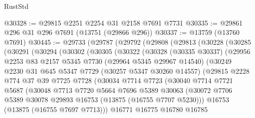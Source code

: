 \begin{lexlean}{RustStd}
\begin{coremodule}
@30328 := @29815 @2251 @2254 @31 @2158 @7691 @7731
@30335 := @29861 @296 @31 @296 @7691 (@13751 (@29866 @296))
@30337 := @13759 (@13760 @7691)
@30445 := @29733
    (@29787
      (@29792
        (@29808
          (@29813
            (@30228
              (@30285
                (@30291
                  (@30294
                    (@30302
                      (@30305
                        (@30322
                          (@30328
                            (@30335 @30337)
                            (@29956
                              @2253
                              @83
                              @2157
                              @5345
                              @7730
                              (@29964 @5345 @29967 @14540)
                              (@30249
                                @2230
                                @31
                                @645
                                @5347
                                @7729
                                (@30257 @5347 @30260 @14557)
                                (@29815
                                  @2228
                                  @774
                                  @37
                                  @39
                                  @7725
                                  @7728
                                  (@30034
                                    @7714
                                    @7723
                                    (@30040
                                      @7714
                                      @7721
                                      @5687
                                      (@30048
                                        @7713
                                        @7720
                                        @5664
                                        @7696
                                        @5389
                                        @30063
                                        (@30072
                                          @7706
                                          @5389
                                          @30078
                                          @29893
                                          @16753
                                          (@13875 (@16755 @7707 @5230)))
                                        @16753
                                        (@13875 (@16755 @7697 @7713)))
                                      @16771
                                      @16775
                                      @16780
                                      @16785

\end{coremodule}
\end{lexlean}
